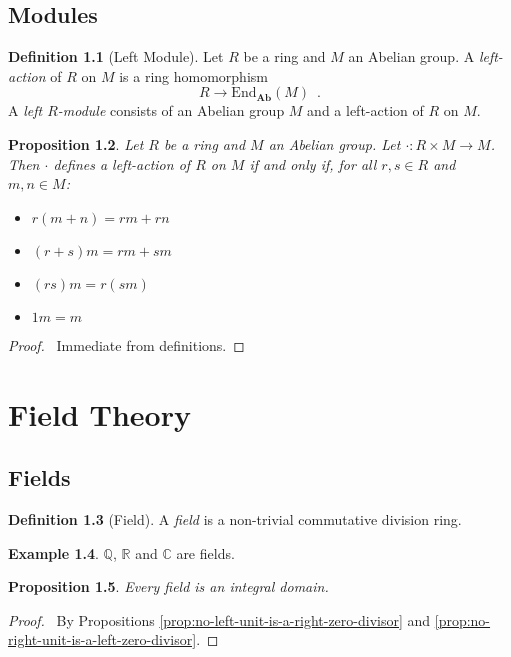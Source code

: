 \documentclass{book}
\let\qed\relax
\newtheorem{prop}{Proposition}[chapter]
\theoremstyle{definition}
\newtheorem{df}[prop]{Definition}
\newtheorem{ex}[prop]{Example}
\newcommand{\Ab}{\ensuremath{\mathbf{Ab}}}
\newcommand{\End}[2]{\ensuremath{\mathrm{End}_{#1} \left( {#2} \right)}}
\begin{document}
\chapter{Modules}

\begin{df}[Left Module]
Let $R$ be a ring and $M$ an Abelian group. A \emph{left-action} of $R$ on $M$ is a ring homomorphism
\[ R \rightarrow \End{\Ab}{M} \enspace . \]
A \emph{left $R$-module} consists of an Abelian group $M$ and a left-action of $R$ on $M$.
\end{df}

\begin{prop}
Let $R$ be a ring and $M$ an Abelian group. Let $\cdot : R \times M \rightarrow M$. Then $\cdot$ defines a left-action of $R$ on $M$ if and only if, for all $r,s \in R$ and $m,n \in M$:
\begin{itemize}
\item $r(m+n) = rm + rn$
\item $(r+s)m = rm + sm$
\item $(rs)m = r(sm)$
\item $1m = m$
\end{itemize}
\end{prop}

\begin{proof}
\pf\ Immediate from definitions. \qed
\end{proof}

\part{Field Theory}

\chapter{Fields}

\begin{df}[Field]
A \emph{field} is a non-trivial commutative division ring.
\end{df}

\begin{ex}
$\mathbb{Q}$, $\mathbb{R}$ and $\mathbb{C}$ are fields.
\end{ex}

\begin{prop}
Every field is an integral domain.
\end{prop}

\begin{proof}
\pf\ By Propositions \ref{prop:no-left-unit-is-a-right-zero-divisor} and \ref{prop:no-right-unit-is-a-left-zero-divisor}. \qed
\end{proof}
\end{document}

